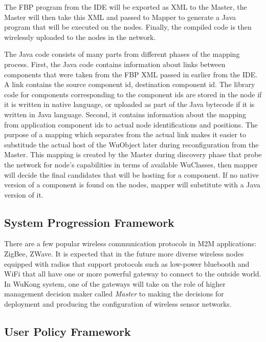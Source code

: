The FBP program from the IDE will be exported as XML to the Master, the Master
will then take this XML and passed to Mapper to generate a Java program that
will be executed on the nodes. Finally, the compiled code is then wirelessly
uploaded to the nodes in the network.

The Java code consists of many parts from different phases of the mapping process.
First, the Java code contains information about links between components that
were taken from the FBP XML passed in earlier from the IDE. A link contains the
source component id, destination component id. The library code for components
corresponding to the component ids are stored in the node if it is written in
native language, or uploaded as part of the Java bytecode if it is written in
Java language. Second, it contains information about the mapping from
application component ids to actual node identifications and positions. The
purpose of a mapping which separates from the actual link makes it easier to
substitude the actual host of the WuObject later during
reconfiguration from the Master. This mapping is created by the Master during
discovery phase that probe the network for node's capabilities in terms of
available WuClasses, then mapper will decide the final candidates that will be
hosting for a component. If no native version of a component is found on the
nodes, mapper will substitute with a Java version of it.

\subsection{System Progression Framework}

There are a few popular wireless communication protocols in M2M applications:
ZigBee, ZWave. It is expected that in the future more diverse
wireless nodes equipped with radios that support protocols such as low-power
bluebooth and WiFi that all have one or more powerful gateway to connect to the
outside world. In WuKong system, one of the gateways will take on the role of
higher management decision maker called \emph{Master} to making the decisions for
deployment and producing the configuration of wireless sensor networks.


\subsection{User Policy Framework}

